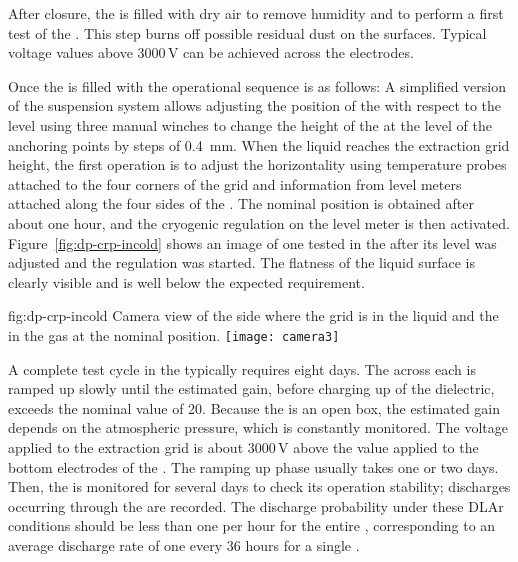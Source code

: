 After closure, the \coldbox is filled with dry air to remove humidity and to perform a first  test of the . This step burns off possible residual dust on the  surfaces. Typical voltage values above 3000\,V can be achieved across the  electrodes.

Once the \coldbox is filled with  the operational sequence is as follows:
A simplified version of the suspension system allows adjusting the position of the  with respect to the  level using three manual winches to change the height of the  at the level of the anchoring points by steps of \SI{0.4}{mm}.
When the liquid reaches the extraction grid height, the first operation is to adjust the horizontality using temperature probes attached to  the four corners of the grid and information from level meters attached along the four sides of the . The nominal position is obtained after about one hour, and the cryogenic regulation on the  level meter is then activated. Figure~\ref{fig:dp-crp-incold} shows an image of one   tested in the \coldbox after its level was adjusted and the regulation was started. The flatness of the liquid surface is clearly visible and is well below the expected \coldbox requirement.

\begin{dunefigure}
{fig:dp-crp-incold}
{Camera view of the  side where the grid is in the liquid and the  in the gas at the nominal position.}
\texttt{[image: camera3]}
\end{dunefigure}

A  complete  test cycle in the \coldbox typically requires eight days. The  across each  is ramped up slowly until the estimated gain, before charging up of the dielectric, exceeds the nominal value of \num{20}. Because the \coldbox is an open box, the estimated gain depends on the atmospheric pressure, which is constantly monitored. The voltage applied to the extraction grid is about 3000\,V above the value applied to the bottom electrodes of the . The  ramping up phase usually takes one or two days. Then, the  is monitored for several days to check its  operation stability; discharges occurring through the  are recorded. The discharge probability under these DLAr  conditions should be less than one per hour for the entire , corresponding to an average discharge rate of one every \num{36} hours for a single .

